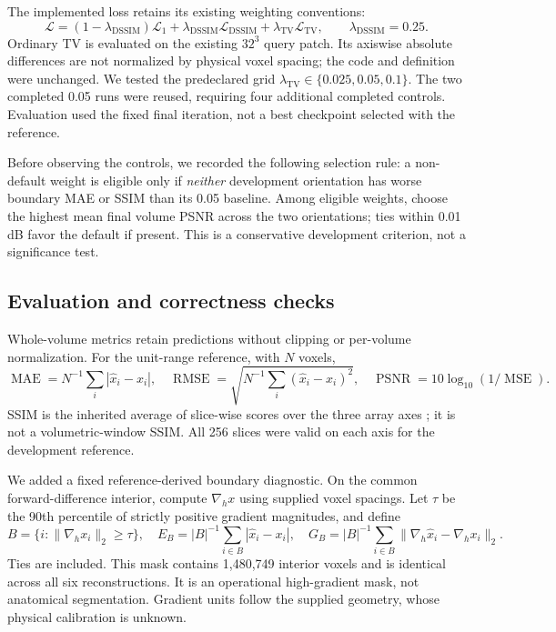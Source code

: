 \documentclass[10pt,a4paper]{article}
\begin{document}
The implemented loss retains its existing weighting conventions:
\begin{equation}
\mathcal L=(1-\lambda_{\mathrm{DSSIM}})\mathcal L_1+
\lambda_{\mathrm{DSSIM}}\mathcal L_{\mathrm{DSSIM}}+
\lambda_{\mathrm{TV}}\mathcal L_{\mathrm{TV}},\qquad
\lambda_{\mathrm{DSSIM}}=0.25.
\end{equation}
Ordinary TV is evaluated on the existing $32^3$ query patch. Its axiswise absolute differences are not normalized by physical voxel spacing; the code and definition were unchanged. We tested the predeclared grid $\lambda_{\mathrm{TV}}\in\{0.025,0.05,0.1\}$. The two completed 0.05 runs were reused, requiring four additional completed controls. Evaluation used the fixed final iteration, not a best checkpoint selected with the reference.

Before observing the controls, we recorded the following selection rule: a non-default weight is eligible only if \emph{neither} development orientation has worse boundary MAE or SSIM than its 0.05 baseline. Among eligible weights, choose the highest mean final volume PSNR across the two orientations; ties within 0.01 dB favor the default if present. This is a conservative development criterion, not a significance test.

\subsection{Evaluation and correctness checks}
Whole-volume metrics retain predictions without clipping or per-volume normalization. For the unit-range reference, with $N$ voxels,
\begin{equation}
\operatorname{MAE}=N^{-1}\sum_i|\hat x_i-x_i|,\quad
\operatorname{RMSE}=\sqrt{N^{-1}\sum_i(\hat x_i-x_i)^2},\quad
\operatorname{PSNR}=10\log_{10}(1/\operatorname{MSE}).
\end{equation}
SSIM is the inherited average of slice-wise scores over the three array axes \cite{ssim}; it is not a volumetric-window SSIM. All 256 slices were valid on each axis for the development reference.

We added a fixed reference-derived boundary diagnostic. On the common forward-difference interior, compute $\nabla_h x$ using supplied voxel spacings. Let $\tau$ be the 90th percentile of strictly positive gradient magnitudes, and define
\begin{equation}
B=\{i:\|\nabla_h x_i\|_2\geq\tau\},\quad
E_B=|B|^{-1}\sum_{i\in B}|\hat x_i-x_i|,\quad
G_B=|B|^{-1}\sum_{i\in B}\|\nabla_h\hat x_i-\nabla_h x_i\|_2.
\end{equation}
Ties are included. This mask contains 1,480,749 interior voxels and is identical across all six reconstructions. It is an operational high-gradient mask, not anatomical segmentation. Gradient units follow the supplied geometry, whose physical calibration is unknown.
\end{document}
